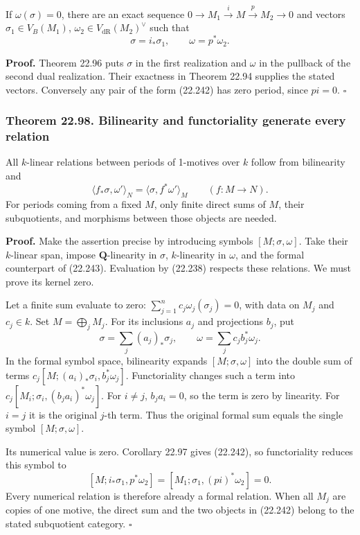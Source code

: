 \documentclass[
  11pt,
  a4paper,
]{article}
\begin{document}
If \(\omega(\sigma)=0\), there are an exact sequence
\(0\to M_1\xrightarrow i M\xrightarrow p M_2\to0\) and vectors
\(\sigma_1\in V_B(M_1)\), \(\omega_2\in V_{\mathrm{dR}}(M_2)^\vee\) such
that \[
 \sigma=i_*\sigma_1,\qquad \omega=p^*\omega_2.
 \tag{22.242}
\]

\textbf{Proof.} Theorem 22.96 puts \(\sigma\) in the first realization
and \(\omega\) in the pullback of the second dual realization. Their
exactness in Theorem 22.94 supplies the stated vectors. Conversely any
pair of the form (22.242) has zero period, since \(pi=0\). \(\square\)

\subsubsection{Theorem 22.98. Bilinearity and functoriality generate
every
relation}\label{theorem-22.98.-bilinearity-and-functoriality-generate-every-relation}

All \(k\)-linear relations between periods of 1-motives over \(k\)
follow from bilinearity and \[
 \langle f_*\sigma,\omega'\rangle_N
       =\langle\sigma,f^*\omega'\rangle_M
 \qquad(f:M\to N).
 \tag{22.243}
\] For periods coming from a fixed \(M\), only finite direct sums of
\(M\), their subquotients, and morphisms between those objects are
needed.

\textbf{Proof.} Make the assertion precise by introducing symbols
\([M;\sigma,\omega]\). Take their \(k\)-linear span, impose
\(\mathbf Q\)-linearity in \(\sigma\), \(k\)-linearity in \(\omega\),
and the formal counterpart of (22.243). Evaluation by (22.238) respects
these relations. We must prove its kernel zero.

Let a finite sum evaluate to zero:
\(\sum_{j=1}^n c_j\omega_j(\sigma_j)=0\), with data on \(M_j\) and
\(c_j\in k\). Set \(M=\bigoplus_jM_j\). For its inclusions \(a_j\) and
projections \(b_j\), put \[
 \sigma=\sum_j(a_j)_*\sigma_j,\qquad
 \omega=\sum_j c_j b_j^*\omega_j.
 \tag{22.244}
\] In the formal symbol space, bilinearity expands \([M;\sigma,\omega]\)
into the double sum of terms \(c_j[M;(a_i)_*\sigma_i,b_j^*\omega_j]\).
Functoriality changes such a term into
\(c_j[M_i;\sigma_i,(b_ja_i)^*\omega_j]\). For \(i\ne j\), \(b_ja_i=0\),
so the term is zero by linearity. For \(i=j\) it is the original
\(j\)-th term. Thus the original formal sum equals the single symbol
\([M;\sigma,\omega]\).

Its numerical value is zero. Corollary 22.97 gives (22.242), so
functoriality reduces this symbol to \[
 [M;i_*\sigma_1,p^*\omega_2]
    =[M_1;\sigma_1,(pi)^*\omega_2]=0.
 \tag{22.245}
\] Every numerical relation is therefore already a formal relation. When
all \(M_j\) are copies of one motive, the direct sum and the two objects
in (22.242) belong to the stated subquotient category. \(\square\)
\end{document}
